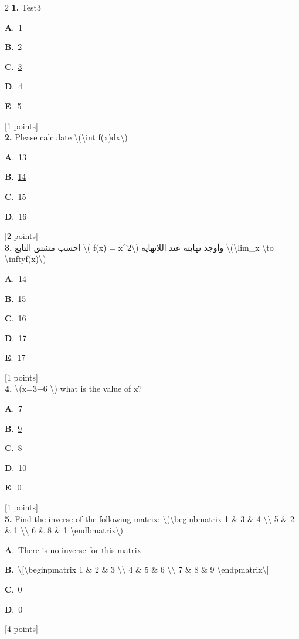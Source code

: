 \documentclass[12pt]{article}
\newcommand{\choice}[3]{%
  \noindent\textbf{#1}.~#2\hfill#3\par\vspace{0.25em}
}
\begin{document}
\begin{multicols}{2}
\noindent \textbf{\textenglish{1.}} {\textenglish{Test3}}

\noindent\choice{A}{{\textenglish{1}}}{}
\noindent\choice{B}{{\textenglish{2}}}{}
\noindent\choice{C}{\underline{{\textenglish{3}}}}{}
\noindent\choice{D}{{\textenglish{4}}}{}
\noindent\choice{E}{{\textenglish{5}}}{}
\hfill {\textenglish{[1 points]}}\\[0.5em]

\noindent \textbf{\textenglish{2.}} {\textenglish{Please calculate \textbackslash{}(\textbackslash{}int f(x)dx\textbackslash{})}}

\noindent\choice{A}{{\textenglish{13}}}{}
\noindent\choice{B}{\underline{{\textenglish{14}}}}{}
\noindent\choice{C}{{\textenglish{15}}}{}
\noindent\choice{D}{{\textenglish{16}}}{}
\hfill {\textenglish{[2 points]}}\\[0.5em]

\noindent \textbf{\textenglish{3.}} {\textarabic{احسب مشتق التابع \textbackslash{}( f(x) = x\^{}2\textbackslash{}) وأوجد نهايته عند اللانهاية \textbackslash{}(\textbackslash{}lim\_{x \textbackslash{}to \textbackslash{}infty}f(x)\textbackslash{})}}

\noindent\choice{A}{{\textenglish{14}}}{}
\noindent\choice{B}{{\textenglish{15}}}{}
\noindent\choice{C}{\underline{{\textenglish{16}}}}{}
\noindent\choice{D}{{\textenglish{17}}}{}
\noindent\choice{E}{{\textenglish{17}}}{}
\hfill {\textenglish{[1 points]}}\\[0.5em]

\noindent \textbf{\textenglish{4.}} {\textenglish{\textbackslash{}(x=3+6 \textbackslash{}) what is the value of x?}}

\noindent\choice{A}{{\textenglish{7}}}{}
\noindent\choice{B}{\underline{{\textenglish{9}}}}{}
\noindent\choice{C}{{\textenglish{8}}}{}
\noindent\choice{D}{{\textenglish{10}}}{}
\noindent\choice{E}{{\textenglish{0}}}{}
\hfill {\textenglish{[1 points]}}\\[0.5em]

\noindent \textbf{\textenglish{5.}} {\textenglish{Find the inverse of the following matrix: \textbackslash{}(\textbackslash{}begin{bmatrix} 1 \& 3 \& 4 \textbackslash{}\textbackslash{} 5 \& 2 \& 1 \textbackslash{}\textbackslash{} 6 \& 8 \& 1 \textbackslash{}end{bmatrix}\textbackslash{})}}

\noindent\choice{A}{\underline{{\textenglish{There is no inverse for this matrix}}}}{}
\noindent\choice{B}{{\textenglish{\textbackslash{}[\textbackslash{}begin{pmatrix} 1 \& 2 \& 3 \textbackslash{}\textbackslash{} 4 \& 5 \& 6 \textbackslash{}\textbackslash{} 7 \& 8 \& 9  \textbackslash{}end{pmatrix}\textbackslash{}]}}}{}
\noindent\choice{C}{{\textenglish{0}}}{}
\noindent\choice{D}{{\textenglish{0}}}{}
\hfill {\textenglish{[4 points]}}\\[0.5em]


\end{multicols}
\end{document}

